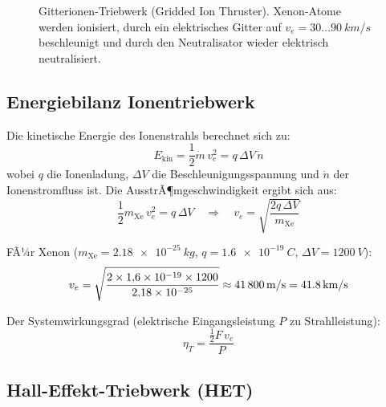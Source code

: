 ﻿\documentclass[12pt,a4paper]{article}
\newcommand{\mdot}{\dot{m}}
\begin{document}
\begin{figure}[H]
\caption{Gitterionen-Triebwerk (Gridded Ion Thruster). Xenon-Atome werden ionisiert,
durch ein elektrisches Gitter auf $v_e = 30\ldots\SI{90}{km/s}$ beschleunigt und
durch den Neutralisator wieder elektrisch neutralisiert.}
\label{fig:ionentriebwerk}
\end{figure}

\subsection{Energiebilanz Ionentriebwerk}

Die kinetische Energie des Ionenstrahls berechnet sich zu:
\[
  E_{\mathrm{kin}} = \frac{1}{2}\mdot\,v_e^2 = q\,\Delta V\,\dot{n}
\]
wobei $q$ die Ionenladung, $\Delta V$ die Beschleunigungsspannung und $\dot{n}$ der
Ionenstromfluss ist. Die AusstrÃ¶mgeschwindigkeit ergibt sich aus:
\[
  \frac{1}{2}m_{\mathrm{Xe}}\,v_e^2 = q\,\Delta V
  \quad\Rightarrow\quad
  v_e = \sqrt{\frac{2q\,\Delta V}{m_{\mathrm{Xe}}}}
\]

FÃ¼r Xenon ($m_{\mathrm{Xe}} = \SI{2.18e-25}{kg}$, $q = \SI{1.6e-19}{C}$,
$\Delta V = \SI{1200}{V}$):
\[
  v_e = \sqrt{\frac{2 \times 1{,}6\times10^{-19} \times 1200}{2{,}18\times10^{-25}}}
  \approx \SI{41\,800}{m/s} = \SI{41.8}{km/s}
\]

Der Systemwirkungsgrad (elektrische Eingangsleistung $P$ zu Strahlleistung):
\[
  \eta_T = \frac{\frac{1}{2}F\,v_e}{P}
\]

\subsection{Hall-Effekt-Triebwerk (HET)}
\end{document}
